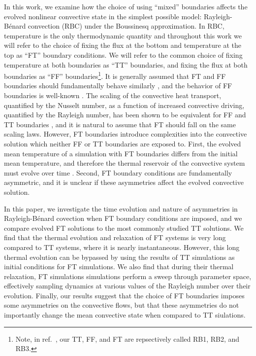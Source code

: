 \documentclass[aps, pre, onecolumn, nofootinbib, notitlepage, groupedaddress, amsfonts, amssymb, amsmath, longbibliography, superscriptaddress]{revtex4-1}
\newcommand{\RB}{Rayleigh-B\'{e}nard }
\begin{document}
In this work, we examine how the choice of using ``mixed'' boundaries affects the evolved nonlinear convective state in the simplest possible model: \RB convection (RBC) under the Boussinesq approximation.
In RBC, temperature is the only thermodynamic quantity and throughout this work we will refer to the choice of fixing the flux at the bottom and temperature at the top as ``FT'' boundary conditions.
We will refer to the common choice of fixing temperature at both boundaries as ``TT'' boundaries, and fixing the flux at both boundaries as ``FF'' boundaries\footnote{Note, in ref.~\cite{goluskin2015}, our TT, FF, and FT are repsectively called RB1, RB2, and RB3.}.
It is generally assumed that FT and FF boundaries should fundamentally behave similarly \cite{goluskin2015}, and the behavior of FF boundaries is well-known \cite{otero&all2002, johnston&doering2009}.
The scaling of the convective heat transport, quantified by the Nusselt number, as a function of increased convective driving, quantified by the Rayleigh number, has been shown to be equivalent for FF and TT boundaries \cite{johnston&doering2009}, and it is natural to assume that FT should fall on the same scaling laws.
However, FT boundaries introduce complexities into the convective solution which neither FF or TT boundaries are exposed to.
First, the evolved mean temperature of a simulation with FT boundaries differs from the initial mean temperature, and therefore the thermal reservoir of the convective system must evolve over time \cite{anders&all2018}.
Second, FT boundary conditions are fundamentally asymmetric, and it is unclear if these asymmetries affect the evolved convective solution.

In this paper, we investigate the time evolution and nature of asymmetries in \RB covection when FT boundary conditions are imposed, and we compare evolved FT solutions to the most commonly studied TT solutions.
We find that the thermal evolution and relaxation of FT systems is very long compared to TT systems, where it is nearly instantaneous.
However, this long thermal evolution can be bypassed by using the results of TT simulations as initial conditions for FT simulations.
We also find that during their thermal relaxation, FT simulations simulations perform a sweep through parameter space, effectively sampling dynamics at various values of the Rayleigh number over their evolution.
Finally, our results suggest that the choice of FT boundaries imposes some asymmetries on the convective flows, but that these asymmetries do not importantly change the mean convective state when compared to TT siulations.
\end{document}
